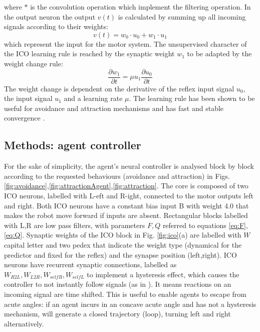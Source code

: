 where $\ast$ is the convolution operation which implement the filtering operation.
In the output neuron the output $v(t)$ is calculated by
summing up all incoming signals according to their weights:
\begin{equation}
v(t)=w_{0}\cdot u_{0}+w_{1}\cdot u_{1}
\end{equation}
which represent the input for the motor system.
The unsupervised character of the ICO learning rule is reached by
the synaptic weight $w_{1}$ to be adapted by the weight
change rule:
\begin{equation}
\frac{\partial w_{1}}{\partial t}=\mu u_{1} \frac{\partial u_{0}}{\partial t}
\end{equation}
The weight change is dependent on the derivative of the reflex input
signal $u_{0}$, the input signal $u_{1}$ and a
learning rate $\mu$. The
learning rule has been shown to be useful for avoidance and attraction
mechanisms and has fast and stable convergence \citep{Porr2006biosys}.


\subsection{Methods: agent controller}
For the sake of simplicity, the agent's neural controller is analysed block
by block according to the requested behaviours (avoidance and attraction)
in Figs. \ref{fig:avoidance},\ref{fig:attractionAgent},\ref{fig:attraction}.
The core is composed of two ICO neurons, labelled with L-eft and R-ight,
connected to the motor outputs left and right. Both ICO neurons have a
constant bias input B with weight 4.0 that makes the robot move forward
if inputs are absent. Rectangular blocks labelled with L,R are low pass
filters, with parameters $F,Q$ referred to equations \ref{eq:F},\ref{eq:Q}.
Synaptic weights of the ICO block in Fig. \ref{fig:ico}(a) are labelled with
$W$ capital letter and two pedex that indicate the weight type
(dynamical for the predictor and fixed for the reflex) and the synapse position (left,right).
ICO neurons have recurrent synaptic connections, labelled as
$W_{R2L},W_{L2R},W_{selfR},W_{selfL}$ to implement a hysteresis effect,
which causes the controller to not instantly follow signals (as in \citealt{Hulse2004,Paseman2002}).
It means reactions on an incoming signal are time shifted. This is useful to enable agents to escape from acute angles: if
an agent incurs in an concave acute angle and has not a hysteresis mechanism,
will generate a closed trajectory (loop), turning left and right alternatively.

